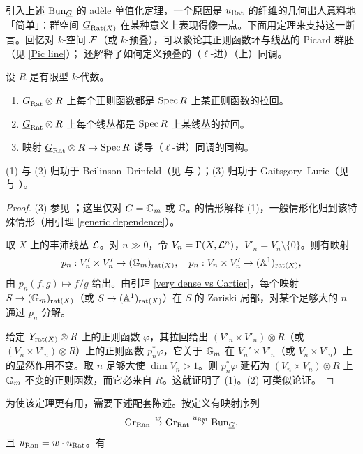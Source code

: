 引入上述 ${\operatorname{Bun}}_{\underline G}$ 的 adèle 单值化定理，一个原因是 $u_{\operatorname{Rat}}$ 的纤维的几何出人意料地「简单」：群空间 ${\underline G}_{\operatorname{Rat}(X)}$ 在某种意义上表现得像一点。下面用定理来支持这一断言。回忆对 $k$-空间 ${\mathcal F}$（或 $k$-预叠），可以谈论其正则函数环与线丛的 Picard 群胚（见 \eqref{Pic line}）；\cite[\S~2]{GL} 还解释了如何定义预叠的（$\ell$-进）（上）同调。

\begin{thm}
设 $R$ 是有限型 $k$-代数。
\begin{enumerate}
\item[(1)] $\underline G_{\operatorname{Rat}}\otimes R$ 上每个正则函数都是 $\operatorname{Spec} R$ 上某正则函数的拉回。
\item[(2)] $\underline G_{\operatorname{Rat}}\otimes R$ 上每个线丛都是 $\operatorname{Spec} R$ 上某线丛的拉回。
\item[(3)] 映射 $\underline G_{\operatorname{Rat}}\otimes R\to \operatorname{Spec} R$ 诱导（$\ell$-进）同调的同构。
\end{enumerate}
\end{thm}

(1) 与 (2) 归功于 Beilinson--Drinfeld（见 \cite[Proposition 4.3.13]{BD} 与 \cite[\S~4.9.1]{BD0}）；(3) 归功于 Gaitsgory--Lurie（见 \cite{Ga3} 与 \cite[Theorem 3.3.1]{GL}）。

\begin{proof}
(3) 参见 \cite{GL}；这里仅对 $G={\mathbb G}_m$ 或 ${\mathbb G}_a$ 的情形解释 (1)，一般情形化归到该特殊情形（用引理 \ref{generic dependence}）。

取 $X$ 上的丰沛线丛 ${\mathcal L}$。对 $n\gg 0$，令 $V_n=\Gamma(X,{\mathcal L}^n)$，$V'_n= V_n\setminus \{0\}$。则有映射
\[p_n:V'_n\times V'_n\to ({\mathbb G}_m)_{\operatorname{rat}(X)},\quad  p_n:V_n\times V'_n\to ({\mathbb A}^1)_{\operatorname{rat}(X)},\]
由 $p_n(f,g)\mapsto f/g$ 给出。由引理 \ref{very dense vs Cartier}，每个映射 $S\to ({\mathbb G}_m)_{\operatorname{rat}(X)}$（或 $S\to ({\mathbb A}^1)_{\operatorname{rat}(X)}$）在 $S$ 的 Zariski 局部，对某个足够大的 $n$ 通过 $p_n$ 分解。

给定 $Y_{\operatorname{rat}(X)}\otimes R$ 上的正则函数 $\varphi$，其拉回给出 $(V'_n\times V'_n)\otimes R$（或 $(V_n\times V'_n)\otimes R$）上的正则函数 $p_n^*\varphi$，它关于 ${\mathbb G}_m$ 在 $V_n'\times V'_n$（或 $V_n\times V'_n$）上的显然作用不变。取 $n$ 足够大使 $\dim V_n>1$。则 $p_n^*\varphi$ 延拓为 $(V_n\times V_n)\otimes R$ 上 ${\mathbb G}_m$-不变的正则函数，而它必来自 $R$。这就证明了 (1)。(2) 可类似论证。
\end{proof}

为使该定理更有用，需要下述配套陈述。按定义有映射序列
\[{\operatorname{Gr}}_{\operatorname{Ran}}\stackrel{w}{\to} {\operatorname{Gr}}_{\operatorname{Rat}}\stackrel{u_{\operatorname{Rat}}}{\to} {\operatorname{Bun}}_{\underline G},\]
且 $u_{\operatorname{Ran}}=w\cdot u_{\operatorname{Rat}}$。有

